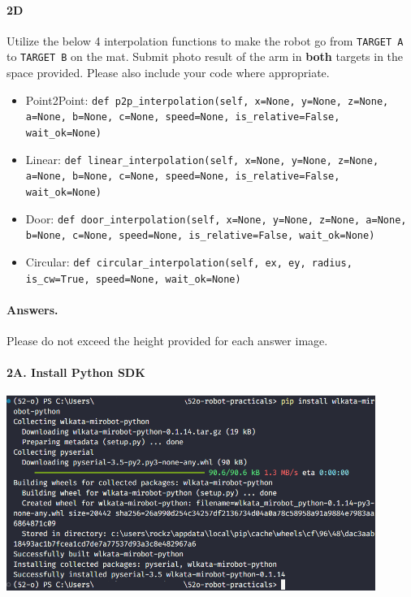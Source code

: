 \paragraph{2D} Utilize the below 4 interpolation functions to make the robot go from \texttt{TARGET A} to \texttt{TARGET B} on the mat.
Submit photo result of the arm in \textbf{both} targets in the space provided.
Please also include your code where appropriate.
\begin{itemize}
    \item Point2Point: \texttt{def p2p\_interpolation(self, x=None, y=None, z=None, a=None, b=None, c=None, speed=None, is\_relative=False, wait\_ok=None)}
    \item Linear: \texttt{def linear\_interpolation(self, x=None, y=None, z=None, a=None, b=None, c=None, speed=None, is\_relative=False, wait\_ok=None)}
    \item Door: \texttt{def door\_interpolation(self, x=None, y=None, z=None, a=None, b=None, c=None, speed=None, is\_relative=False, wait\_ok=None)}
    \item Circular: \texttt{def circular\_interpolation(self, ex, ey, radius, is\_cw=True, speed=None, wait\_ok=None)}
\end{itemize}

\paragraph{Answers.}
Please do not exceed the height provided for each answer image.


\paragraph{2A. Install Python SDK}
\begin{center}
    \includegraphics[height=2.5in]{image/2a_pythonsdk.png}
\end{center}

